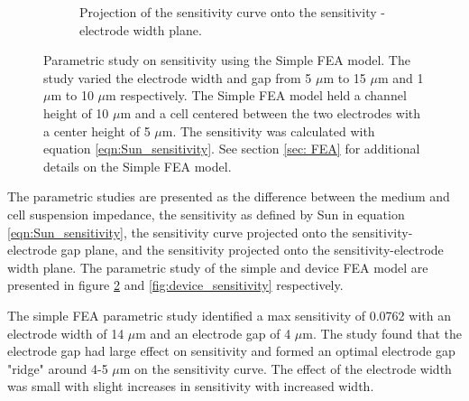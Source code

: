 \begin{figure}[h]
\begin{subfigure}[t]{0.49\textwidth}
        \caption{Projection of the sensitivity curve onto the sensitivity - electrode width plane.}
        \label{fig:simple_sensitivity_width}
    \end{subfigure}
    \caption[Simple FEA model sensitivity]{Parametric study on sensitivity using the Simple FEA model. The study varied the electrode width and gap from 5 $\mu$m to 15 $\mu$m and 1 $\mu$m to 10 $\mu$m respectively. The Simple FEA model held a channel height of 10 $\mu$m and a cell centered between the two electrodes with a center height of 5 $\mu$m. The sensitivity was calculated with equation \ref{eqn:Sun_sensitivity}. See section \ref{sec: FEA} for additional details on the Simple FEA model.} 
    \label{fig:simple_sensitivity}
\end{figure}

\newpage

\par The parametric studies are presented as the difference between the medium and cell suspension impedance, the sensitivity as defined by Sun in equation \ref{eqn:Sun_sensitivity}, the sensitivity curve projected onto the sensitivity-electrode gap plane, and the sensitivity projected onto the sensitivity-electrode width plane. The parametric study of the simple and device FEA model are presented in figure \ref{fig:simple_sensitivity} and \ref{fig:device_sensitivity} respectively.

\par The simple FEA parametric study identified a max sensitivity of 0.0762 with an electrode width of 14 $\mu$m and an electrode gap of 4 $\mu$m. The study found that the electrode gap had large effect on sensitivity and formed an optimal electrode gap "ridge" around 4-5 $\mu$m on the sensitivity curve. The effect of the electrode width was small with slight increases in sensitivity with increased width.



